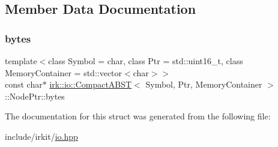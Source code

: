 \subsection{Member Data Documentation}
\mbox{\label{structirk_1_1io_1_1CompactABST_1_1NodePtr_aae75be8f19fffc0ac63ab70d27d2d862}} 
\subsubsection{\texorpdfstring{bytes}{bytes}}
{\footnotesize\ttfamily template$<$class Symbol = char, class Ptr = std\+::uint16\+\_\+t, class Memory\+Container = std\+::vector$<$char$>$$>$ \\
const char$\ast$ \mbox{\hyperlink{classirk_1_1io_1_1CompactABST}{irk\+::io\+::\+Compact\+A\+B\+ST}}$<$ Symbol, Ptr, Memory\+Container $>$\+::Node\+Ptr\+::bytes}



The documentation for this struct was generated from the following file\+:\begin{DoxyCompactItemize}
\item 
include/irkit/\mbox{\hyperlink{io_8hpp}{io.\+hpp}}\end{DoxyCompactItemize}
